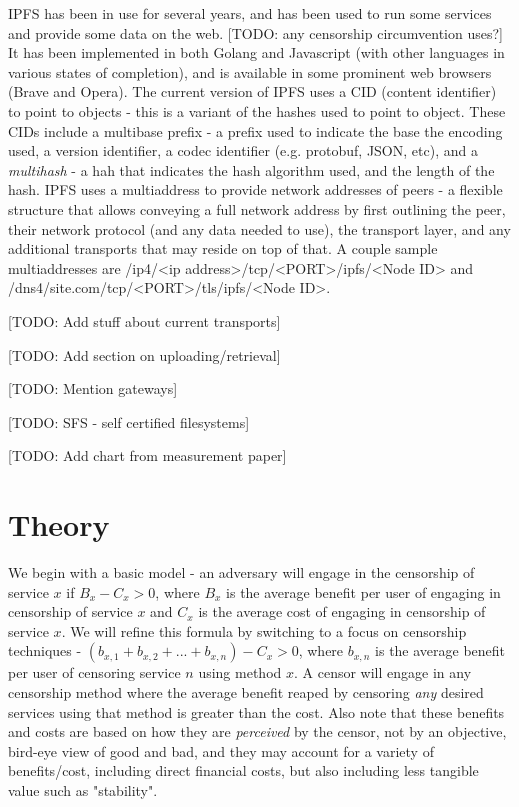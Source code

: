 \documentclass[12pt]{report}
\begin{document}
IPFS has been in use for several years, and has been used to run some services and provide some data on the web. [TODO: any censorship circumvention uses?] It has been implemented in both Golang and Javascript (with other languages in various states of completion), and is available in some prominent web browsers (Brave and Opera).\cite{ipfs-measure} The current version of IPFS uses a CID (content identifier) to point to objects - this is a variant of the hashes used to point to object. These CIDs include a multibase prefix - a prefix used to indicate the base the encoding used, a version identifier, a codec identifier (e.g. protobuf, JSON, etc), and a \emph{multihash} - a hah that indicates the hash algorithm used, and the length of the hash.\cite{ipfs-measure} IPFS uses a multiaddress to provide network addresses of peers - a flexible structure that allows conveying a full network address by first outlining the peer, their network protocol (and any data needed to use), the transport layer, and any additional transports that may reside on top of that.\cite{ipfs-measure} A couple sample multiaddresses are /ip4/<ip address>/tcp/<PORT>/ipfs/<Node ID> and /dns4/site.com/tcp/<PORT>/tls/ipfs/<Node ID>.

[TODO: Add stuff about current transports]

[TODO: Add section on uploading/retrieval]

[TODO: Mention gateways]

[TODO: SFS - self certified filesystems]

[TODO: Add chart from measurement paper]

\chapter{Theory}
\label{theory}

We begin with a basic model - an adversary will engage in the censorship of service $x$ if $B_x - C_x > 0$, where $B_x$ is the average benefit per user of engaging in censorship of service $x$ and $C_x$ is the average cost of engaging in censorship of service $x$. We will refine this formula by switching to a focus on censorship techniques - $(b_{x,1} + b_{x,2} + ... + b_{x,n}) - C_x > 0$, where $b_{x,n}$ is the average benefit per user of censoring service $n$ using method $x$. A censor will engage in any censorship method where the average benefit reaped by censoring \emph{any} desired services using that method is greater than the cost. Also note that these benefits and costs are based on how they are \emph{perceived} by the censor, not by an objective, bird-eye view of good and bad, and they may account for a variety of benefits/cost, including direct financial costs, but also including less tangible value such as "stability".
\end{document}
